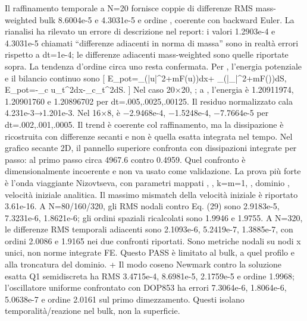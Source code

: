 {}Il raffinamento temporale a N=20 fornisce coppie di differenze RMS mass-weighted bulk 8.6004e-5 e 4.3031e-5 e ordine , coerente con backward Euler. La rianalisi ha rilevato un errore di descrizione nel report: i valori 1.2903e-4 e 4.3031e-5 chiamati “differenze adiacenti in norma di massa” sono in realtà errori rispetto a dt=1e-4; le differenze adiacenti mass-weighted sono quelle riportate sopra. La tendenza d’ordine circa uno resta confermata.\markdownRendererInterblockSeparator
{} Per , l’energia potenziale e il bilancio continuo sono\markdownRendererInterblockSeparator
{}[ E_{pot}=\int_\Omega\left(|\nabla u|^2+mF(u)\right)dx+ \int_\Gamma\left(|\nabla_\Gamma\psi|^2+\beta mF(\psi)\right)dS, \qquad \dot E_{pot}=-\int_\Omega c u_t^2dx-\int_\Gamma c\psi_t^2dS. ]\markdownRendererInterblockSeparator
{}Nel caso 20×20, ; a , l’energia è 1.20911974, 1.20901760 e 1.20896702 per dt=.005,.0025,.00125. Il residuo normalizzato cala 4.231e-3→1.201e-3. Nel 16×8,  è −2.9468e-4, −1.5248e-4, −7.7664e-5 per dt=.002,.001,.0005. Il trend è coerente col raffinamento, ma la dissipazione è ricostruita con differenze secanti e non è quella esatta integrata nel tempo. Nel grafico secante 2D, il pannello superiore confronta  con dissipazioni integrate per passo: al primo passo circa 4967.6 contro 0.4959. Quel confronto è dimensionalmente incoerente e non va usato come validazione.\markdownRendererInterblockSeparator
{}
\markdownRendererSectionEnd \markdownRendererSectionBegin
{}\markdownRendererInterblockSeparator
{} La prova più forte è l’onda viaggiante Nizovtseva, con parametri mappati , , k=m=1, , dominio \markdownRendererInlineMath{[-12,12]\times[0,1]}, velocità iniziale analitica. Il massimo mismatch della velocità iniziale è riportato 3.61e-16. A N=80/160/320, gli RMS nodali contro Eq. (29) sono 2.9183e-5, 7.3231e-6, 1.8621e-6; gli ordini spaziali ricalcolati sono 1.9946 e 1.9755. A N=320, le differenze RMS temporali adiacenti sono 2.1093e-6, 5.2419e-7, 1.3885e-7, con ordini 2.0086 e 1.9165 nei due confronti riportati. Sono metriche nodali su nodi x unici, non norme integrate FE. Questo PASS è limitato al bulk, a quel profilo e alla troncatura del dominio. + Il modo coseno Newmark contro la soluzione esatta Q1 semidiscreta ha RMS 3.4715e-4, 8.6981e-5, 2.1759e-5 e ordine 1.9968; l’oscillatore uniforme confrontato con DOP853 ha errori 7.3064e-6, 1.8064e-6, 5.0638e-7 e ordine 2.0161 sul primo dimezzamento. Questi isolano temporalità/reazione nel bulk, non la superficie.\markdownRendererInterblockSeparator
